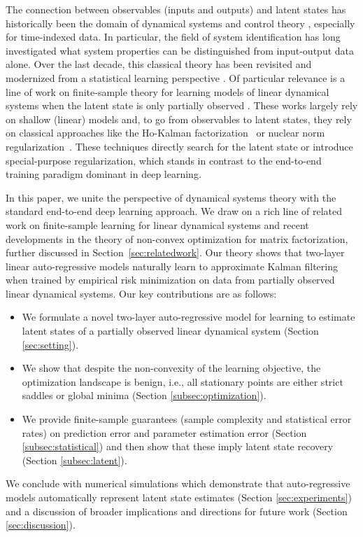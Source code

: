 \documentclass[11pt]{article}
\renewcommand{\cite}{\citep}
\newcommand{\<}{\langle}
\renewcommand{\>}{\rangle}
\numberwithin{equation}{section}
\begin{document}
The connection between observables (inputs and outputs) and latent states has historically been the domain of dynamical systems and control theory \cite{willems1989models},
especially for time-indexed data.
In particular, the field of system identification has long investigated what system properties can be distinguished from input-output data alone.
Over the last decade, this classical theory has been revisited and modernized from a statistical learning perspective \cite{dean2019sample, simchowitz2018learning}.
Of particular relevance is a 
line of work on finite-sample theory for learning models of linear dynamical systems when the latent state is only partially observed \cite{oymak2018non, bakshi2023new,sarkar2021finite}. These works largely rely on shallow (linear) models and,
to go from observables to latent states,
they rely on classical approaches like the Ho-Kalman factorization~\cite{ho1966effective} or nuclear norm regularization~\cite{recht2010guaranteed,sun2022finite}.
These techniques directly search for the latent state or introduce special-purpose regularization,
which stands in contrast to the end-to-end training paradigm dominant in deep learning.

In this paper, we unite the perspective of dynamical systems theory with the standard end-to-end deep learning approach.
We draw on a rich line of related work on finite-sample learning for linear dynamical systems and recent developments in the theory of non-convex optimization for matrix factorization, further discussed in Section~\ref{sec:relatedwork}.
Our theory shows that two-layer linear auto-regressive models naturally learn to approximate Kalman filtering
when trained by empirical risk minimization on data from partially observed linear dynamical systems.
Our key contributions are as follows:
\begin{itemize}
    \item We formulate a novel two-layer auto-regressive model for learning to estimate latent states of a partially observed linear dynamical system (Section \ref{sec:setting}).
    \item We show that despite the non-convexity of the learning objective, the optimization landscape is benign, i.e., all stationary points are either strict saddles or global minima (Section \ref{subsec:optimization}). 
    \item We provide finite-sample guarantees (sample complexity and statistical error rates) on prediction error and parameter estimation error (Section \ref{subsec:statistical}) and then show that these imply latent state recovery (Section \ref{subsec:latent}).
\end{itemize}
We conclude with numerical simulations which demonstrate that auto-regressive models automatically represent latent state estimates (Section \ref{sec:experiments}) and a discussion of broader implications and directions for future work (Section \ref{sec:discussion}).
%
\end{document}
